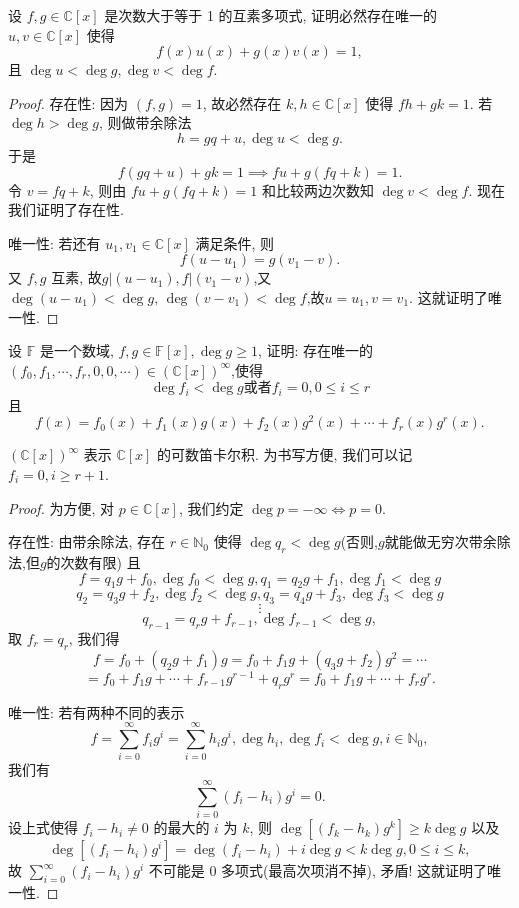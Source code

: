 \documentclass[../../main.tex]{subfiles}%
\begin{document}
\begin{proposition}
设 \( f,g \in \mathbb{C}[x] \) 是次数大于等于 1 的互素多项式, 证明必然存在唯一的 \( u,v \in \mathbb{C}[x] \) 使得
\[
f(x)u(x) + g(x)v(x) = 1,
\]
且 \( \deg u < \deg g, \deg v < \deg f \).
\end{proposition}
\begin{proof}

存在性:
因为 \( (f,g) = 1 \), 故必然存在 \( k,h \in \mathbb{C}[x] \) 使得 \( fh + gk = 1 \). 若 \( \deg h > \deg g \), 则做带余除法
\[
h = gq + u, \deg u < \deg g.
\]
于是
\[
f(gq + u) + gk = 1 \implies fu + g(fq + k) = 1.
\]
令 \( v = fq + k \), 则由 \( fu + g(fq + k) = 1 \) 和比较两边次数知 \( \deg v < \deg f \). 现在我们证明了存在性.

唯一性:
若还有 \( u_1, v_1 \in \mathbb{C}[x] \) 满足条件, 则
\[
f(u - u_1) = g(v_1 - v).
\]
又 \( f,g \) 互素, 故$
g|(u - u_1), f|(v_1 - v)$,又$\deg (u-u_1)<\deg g,\,\deg(v-v_1)<\deg f$,故$u = u_1, v = v_1$.
这就证明了唯一性.
\end{proof}

\begin{example}
设 \( \mathbb{F} \) 是一个数域, \( f,g \in \mathbb{F}[x], \deg g \geqslant 1 \), 证明: 存在唯一的 \( (f_0,f_1,\cdots,f_r,0,0,\cdots) \in (\mathbb{C}[x])^\infty \),使得
\[
\deg f_i < \deg g \text{或者} f_i = 0, 0 \leqslant i \leqslant r
\]
且
\[
f(x) = f_0(x) + f_1(x)g(x) + f_2(x)g^2(x) + \cdots + f_r(x)g^r(x).
\]
\end{example}
\begin{remark}
\( (\mathbb{C}[x])^\infty \) 表示 \( \mathbb{C}[x] \) 的可数笛卡尔积. 为书写方便, 我们可以记 \( f_i = 0, i \geqslant r + 1 \).
\end{remark}
\begin{proof}
为方便, 对 \( p \in \mathbb{C}[x] \), 我们约定 \( \deg p = -\infty \Leftrightarrow p = 0 \).

存在性:
由带余除法, 存在 \( r \in \mathbb{N}_0 \) 使得 \( \deg q_r < \deg g \)(否则,$g$就能做无穷次带余除法,但$g$的次数有限) 且
\[
f = q_1g + f_0, \deg f_0 < \deg g, q_1 = q_2g + f_1, \deg f_1 < \deg g
\]
\[
q_2 = q_3g + f_2, \deg f_2 < \deg g, q_3 = q_4g + f_3, \deg f_3 < \deg g
\]
\[
\vdots
\]
\[
q_{r-1} = q_r g + f_{r-1}, \deg f_{r-1} < \deg g,
\]
取 \( f_r = q_r \), 我们得
\[
f = f_0 + (q_2g + f_1)g = f_0 + f_1g + (q_3g + f_2)g^2 = \cdots
\]
\[
= f_0 + f_1g + \cdots + f_{r-1}g^{r-1} + q_r g^r = f_0 + f_1g + \cdots + f_r g^r.
\]

唯一性:
若有两种不同的表示
\[
f = \sum_{i=0}^\infty f_i g^i = \sum_{i=0}^\infty h_i g^i, \deg h_i, \deg f_i < \deg g, i \in \mathbb{N}_0,
\]
我们有
\[
\sum_{i=0}^\infty (f_i - h_i) g^i = 0.
\]
设上式使得 \( f_i - h_i \neq 0 \) 的最大的 \( i \) 为 \( k \), 则 \( \deg [(f_k - h_k) g^k] \geqslant k \deg g \) 以及
\[
\deg [(f_i - h_i) g^i] = \deg (f_i - h_i) + i \deg g < k \deg g, 0 \leqslant i \leqslant k,
\]
故 \( \sum_{i=0}^\infty (f_i - h_i) g^i \) 不可能是 0 多项式(最高次项消不掉), 矛盾! 这就证明了唯一性.
\end{proof}
\end{document}
